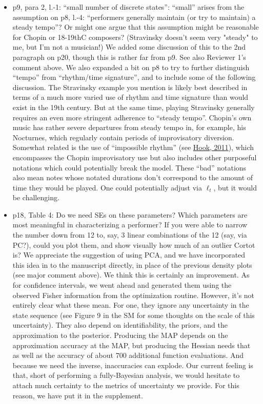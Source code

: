 \documentclass[12pt]{article}
\newcommand{\sresp}[1]{\textcolor{cobalt}{#1}}
\begin{document}
\begin{itemize}
\item p9, para 2, l.-1: ``small number of discrete states'':
``small'' arises from the assumption on p8, l.-4: ``performers generally
maintain (or try to maintain) a steady tempo''? Or might one argue that
this assumption might be reasonable for Chopin or 18-19thC composers?
(Stravinsky doesn't seem very "steady" to me, but I'm not a musician!) \sresp{We added some discussion of this to the 2nd paragraph on p20, though this is rather far from p9. See also Reviewer 1's comment above. We also expanded a bit on p8 to try to further distinguish ``tempo'' from ``rhythm/time signature'', and to include some of the following discussion. The Stravinsky example you mention is likely best described in terms of a much more varied use of rhythm and time signature than would exist in the 19th century. But at the same time, playing Stravinsky generally requires an even more stringent adherence to ``steady tempo''. Chopin's own music has rather severe departures from steady tempo in, for example, his Nocturnes, which regularly contain periods of improvisatory diversion. Somewhat related is the use of ``impossible rhythm'' (see  \href{https://mtosmt.org/issues/mto.11.17.4/mto.11.17.4.hook.html}{Hook, 2011}), which encompasses the Chopin improvisatory use but also includes other purposeful notations which could potentially break the model. These ``bad''  notations also mean notes whose notated durations don't correspond to the amount of time they would be played. One could potentially adjust via $\ell_t$, but it would be challenging.}


\item p18, Table 4: Do we need SEs on these parameters?  Which parameters are
most meaningful in characterizing a performer?  If you were able to narrow
the number down from 12 to, say, 3 linear combinations of the 12 (say, via
PC?), could you plot them, and show visually how much of an outlier Cortot is? \sresp{We appreciate the suggestion of using PCA, and we have incorporated this idea in to the manuscript directly, in place of the previous density plots (see major comment above). We think this is certainly an improvement. As for confidence intervals, we went ahead and generated them using the observed Fisher information from the optimization routine. However, it's not entirely clear what these mean. For one, they ignore any uncertainty in the state sequence (see Figure 9 in the SM for some thoughts on the scale of this uncertainty). They also depend on identifiability, the priors, and the approximation to the posterior. Producing the MAP depends on the approximation accuracy at the MAP, but producing the Hessian needs that as well as the accuracy of about $700$ additional function evaluations. And because we need the inverse, inaccuracies can explode. Our current feeling is that, short of performing a fully-Bayesian analysis, we would hesitate to attach much certainty to the metrics of uncertainty we provide. For this reason, we have put it in the supplement.} 


\end{itemize}
\end{document}
